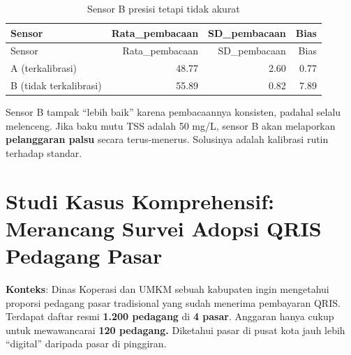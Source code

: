 \documentclass[
  indonesian,
  letterpaper,
]{book}
\begin{document}
\begin{longtable}[]{@{}lrrr@{}}
\caption{Sensor B presisi tetapi tidak akurat}\tabularnewline
\toprule\noalign{}
Sensor & Rata\_pembacaan & SD\_pembacaan & Bias \\
\midrule\noalign{}
\endfirsthead
\toprule\noalign{}
Sensor & Rata\_pembacaan & SD\_pembacaan & Bias \\
\midrule\noalign{}
\endhead
\bottomrule\noalign{}
\endlastfoot
A (terkalibrasi) & 48.77 & 2.60 & 0.77 \\
B (tidak terkalibrasi) & 55.89 & 0.82 & 7.89 \\
\end{longtable}

Sensor B tampak ``lebih baik'' karena pembacaannya konsisten, padahal
selalu melenceng. Jika baku mutu TSS adalah 50 mg/L, sensor B akan
melaporkan \textbf{pelanggaran palsu} secara terus-menerus. Solusinya
adalah kalibrasi rutin terhadap standar.

\section{Studi Kasus Komprehensif: Merancang Survei Adopsi QRIS Pedagang
Pasar}\label{studi-kasus-komprehensif-merancang-survei-adopsi-qris-pedagang-pasar}

\textbf{Konteks}: Dinas Koperasi dan UMKM sebuah kabupaten ingin
mengetahui proporsi pedagang pasar tradisional yang sudah menerima
pembayaran QRIS. Terdapat daftar resmi \textbf{1.200 pedagang} di
\textbf{4 pasar}. Anggaran hanya cukup untuk mewawancarai \textbf{120
pedagang.} Diketahui pasar di pusat kota jauh lebih ``digital'' daripada
pasar di pinggiran.
\end{document}

